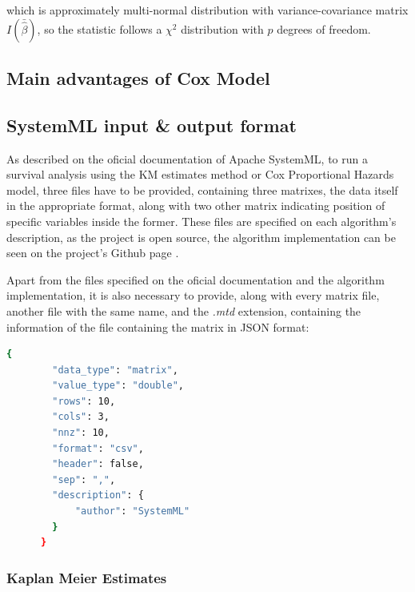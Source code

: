 \documentclass[11pt]{book} %
\begin{document}
        which is approximately multi-normal distribution with variance-covariance matrix $I(\bar{\hat{\beta}})$, so the statistic follows a $\chi^2$ distribution with $p$ degrees of freedom.




    \subsection{Main advantages of Cox Model}











  \subsection{SystemML input \& output format}

    As described on the oficial documentation of Apache SystemML, to run a survival analysis using the KM estimates method or Cox Proportional Hazards model, three files have to be provided, containing three matrixes, the data itself in the appropriate format, along with two other matrix indicating position of specific variables inside the former. These files are specified on each algorithm's description, as the project is open source, the algorithm implementation can be seen on the project's Github page \cite{systemml_github_page}.

    Apart from the files specified on the oficial documentation and the algorithm implementation, it is also necessary to provide, along with every matrix file, another file with the same name, and the \emph{.mtd} extension, containing the information of the file containing the matrix in JSON format:

    \begin{lstlisting}[label=matrix_metadata_file, language=sh, caption=Example of matrix metadata file in JSON format]
      {
        "data_type": "matrix",
        "value_type": "double",
        "rows": 10,
        "cols": 3,
        "nnz": 10,
        "format": "csv",
        "header": false,
        "sep": ",",
        "description": {
            "author": "SystemML"
        }
      }
    \end{lstlisting}

\newpage

    \subsubsection{Kaplan Meier Estimates}
\end{document}
